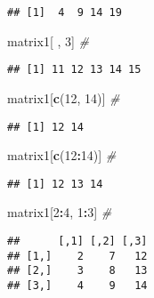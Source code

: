 \documentclass[]{article}
\newenvironment{Shaded}{\begin{snugshade}}{\end{snugshade}}
\newcommand{\CommentTok}[1]{\textcolor[rgb]{0.56,0.35,0.01}{\textit{#1}}}
\newcommand{\DecValTok}[1]{\textcolor[rgb]{0.00,0.00,0.81}{#1}}
\newcommand{\KeywordTok}[1]{\textcolor[rgb]{0.13,0.29,0.53}{\textbf{#1}}}
\newcommand{\NormalTok}[1]{#1}
\newcommand{\OperatorTok}[1]{\textcolor[rgb]{0.81,0.36,0.00}{\textbf{#1}}}
\begin{document}
\begin{verbatim}
## [1]  4  9 14 19
\end{verbatim}

\begin{Shaded}
\begin{Highlighting}[]
\NormalTok{matrix1[ , }\DecValTok{3}\NormalTok{] }\CommentTok{#}
\end{Highlighting}
\end{Shaded}

\begin{verbatim}
## [1] 11 12 13 14 15
\end{verbatim}

\begin{Shaded}
\begin{Highlighting}[]
\NormalTok{matrix1[}\KeywordTok{c}\NormalTok{(}\DecValTok{12}\NormalTok{, }\DecValTok{14}\NormalTok{)] }\CommentTok{#}
\end{Highlighting}
\end{Shaded}

\begin{verbatim}
## [1] 12 14
\end{verbatim}

\begin{Shaded}
\begin{Highlighting}[]
\NormalTok{matrix1[}\KeywordTok{c}\NormalTok{(}\DecValTok{12}\OperatorTok{:}\DecValTok{14}\NormalTok{)] }\CommentTok{#}
\end{Highlighting}
\end{Shaded}

\begin{verbatim}
## [1] 12 13 14
\end{verbatim}

\begin{Shaded}
\begin{Highlighting}[]
\NormalTok{matrix1[}\DecValTok{2}\OperatorTok{:}\DecValTok{4}\NormalTok{, }\DecValTok{1}\OperatorTok{:}\DecValTok{3}\NormalTok{] }\CommentTok{#}
\end{Highlighting}
\end{Shaded}

\begin{verbatim}
##      [,1] [,2] [,3]
## [1,]    2    7   12
## [2,]    3    8   13
## [3,]    4    9   14
\end{verbatim}
\end{document}
